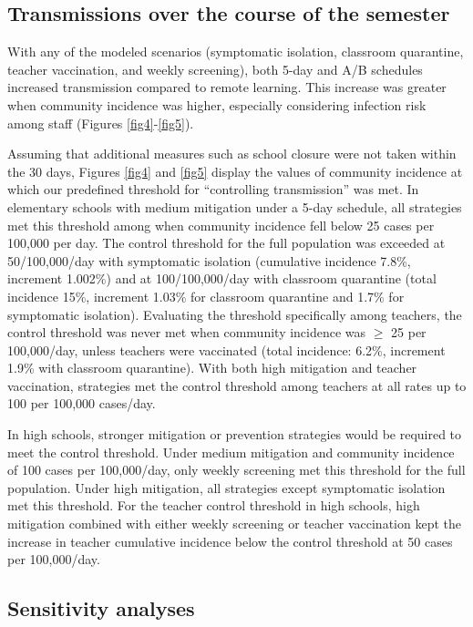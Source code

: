 \documentclass[
]{article}
\begin{document}
\hypertarget{transmissions-over-the-course-of-the-semester}{%
\subsection{Transmissions over the course of the
semester}\label{transmissions-over-the-course-of-the-semester}}

With any of the modeled scenarios (symptomatic isolation, classroom
quarantine, teacher vaccination, and weekly screening), both 5-day and
A/B schedules increased transmission compared to remote learning. This
increase was greater when community incidence was higher, especially
considering infection risk among staff (Figures \ref{fig4}-\ref{fig5}).

Assuming that additional measures such as school closure were not taken
within the 30 days, Figures \ref{fig4} and \ref{fig5} display the values
of community incidence at which our predefined threshold for
``controlling transmission'' was met. In elementary schools with medium
mitigation under a 5-day schedule, all strategies met this threshold
among when community incidence fell below 25 cases per 100,000 per day.
The control threshold for the full population was exceeded at
50/100,000/day with symptomatic isolation (cumulative incidence 7.8\%,
increment 1.002\%) and at 100/100,000/day with classroom quarantine
(total incidence 15\%, increment 1.03\% for classroom quarantine and
1.7\% for symptomatic isolation). Evaluating the threshold specifically
among teachers, the control threshold was never met when community
incidence was \(\geq\) 25 per 100,000/day, unless teachers were
vaccinated (total incidence: 6.2\%, increment 1.9\% with classroom
quarantine). With both high mitigation and teacher vaccination,
strategies met the control threshold among teachers at all rates up to
100 per 100,000 cases/day.

In high schools, stronger mitigation or prevention strategies would be
required to meet the control threshold. Under medium mitigation and
community incidence of 100 cases per 100,000/day, only weekly screening
met this threshold for the full population. Under high mitigation, all
strategies except symptomatic isolation met this threshold. For the
teacher control threshold in high schools, high mitigation combined with
either weekly screening or teacher vaccination kept the increase in
teacher cumulative incidence below the control threshold at 50 cases per
100,000/day.

\hypertarget{sensitivity-analyses}{%
\subsection{Sensitivity analyses}\label{sensitivity-analyses}}
\end{document}
